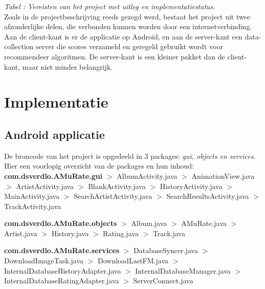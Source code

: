 \documentclass[11pt,a4paper]{article}
\newcommand{\pack}[1]{$>$ #1.java \newline}
\newcounter{tabc}
\newcommand{\tabID} {%
   \stepcounter{tabc}%
   \thetabc}
\begin{document}
	\small \textit{Tabel \tabID : Vereisten van het project met uitleg en implementatiestatus.} \normalsize
	\\ \newline
	Zoals in de projectbeschrijving reeds gezegd werd, bestaat het project uit twee afzonderlijke delen, die verbonden kunnen worden door een internetverbinding. Aan de client-kant is er de applicatie op Android, en aan de server-kant een data-collection server die scores verzameld en geregeld gebruikt wordt voor recommendeer algoritmen. De server-kant is een kleiner pakket dan de client-kant, maar niet minder belangrijk. 
	\\ \newline



\section{Implementatie}
\label{sec:Implementatie}

	\subsection{Android applicatie}
	\label{sec:Android applicatie}	
		\normalsize  
		De broncode van het project is opgedeeld in 3 packages: \textit{gui, objects en services}. Hier een voorlopig overzicht van de packages en hun inhoud:\\
		
		 \textbf{com.dsverdlo.AMuRate.gui} \newline		
		 \pack{AlbumActivity}
		 \pack{AnimationView}
		 \pack{ArtistActivity}
		 \pack{BlankActivity}
		 \pack{HistoryActivity}
		 \pack{MainActivity}
		 \pack{SearchArtistActivity}
		 \pack{SearchResultsActivity} 
		 \pack{TrackActivity}
		 
		\textbf{com.dsverdlo.AMuRate.objects} \newline
		\pack{Album}
		\pack{AMuRate}
		\pack{Artist}
		\pack{History}
		\pack{Rating}
		\pack{Track}
		
		\textbf{com.dsverdlo.AMuRate.services} \newline
		\pack{DatabaseSyncer}
		\pack{DownloadImageTask}
		\pack{DownloadLastFM}
		\pack{InternalDatabaseHistoryAdapter}
		\pack{InternalDatabaseManager}
		\pack{InternalDatabaseRatingAdapter}
		\pack{ServerConnect}
		
\end{document}
